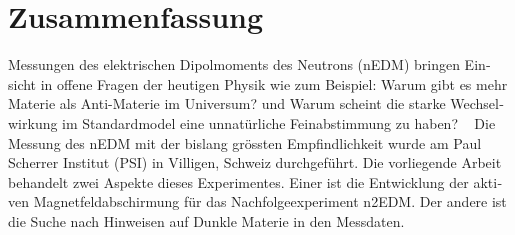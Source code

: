 

\begingroup
\let\clearpage\relax
\let\cleardoublepage\relax
\let\cleardoublepage\relax

\chapter*{Zusammenfassung} %

\newcommand{\jkfootnote}[1]{\footnote{#1}}

\begin{otherlanguage}{german}

Messungen des elektrischen Dipolmoments des Neutrons (nEDM) bringen Einsicht in offene Fragen der heutigen Physik wie zum Beispiel: \glqq{}Warum gibt es mehr Materie als Anti-Materie im Universum?\grqq{} und \glqq{}Warum scheint die starke Wechselwirkung im Standardmodel eine unnatürliche Feinabstimmung zu haben?\grqq{} \  %
Die Messung des nEDM mit der bislang grössten Empfindlichkeit wurde am Paul Scherrer Institut (PSI) in Villigen, Schweiz durchgeführt.
Die vorliegende Arbeit behandelt zwei Aspekte dieses Experimentes. Einer ist die Entwicklung der aktiven Magnetfeldabschirmung  für das Nachfolgeexperiment n2EDM\@.
Der andere ist die Suche nach Hinweisen auf Dunkle Materie in den Messdaten.


\end{otherlanguage}
